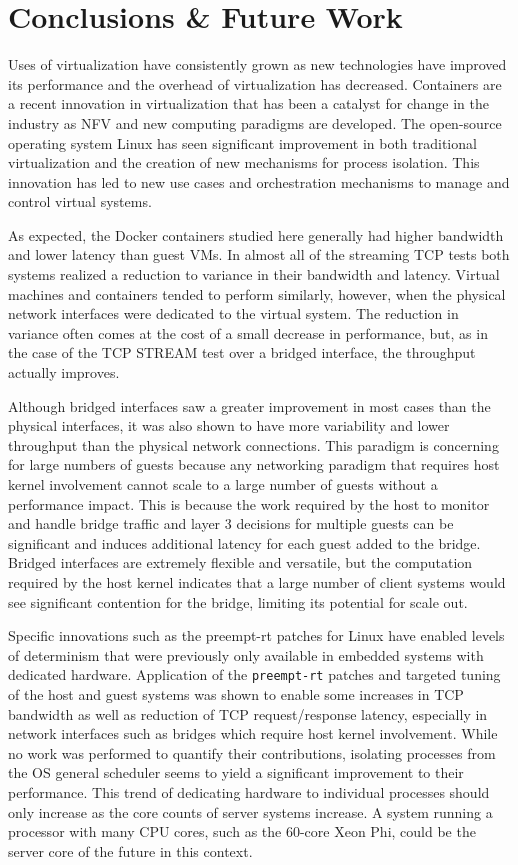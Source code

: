 \chapter{Conclusions \& Future Work}
\label{sec:conclusions}
Uses of virtualization have consistently grown as new technologies have improved its performance and the overhead of virtualization has decreased.  
Containers are a recent innovation in virtualization that has been a catalyst for change in the industry as NFV and new computing paradigms are developed.
The open-source operating system Linux has seen significant improvement in both traditional virtualization and the creation of new mechanisms for process isolation.  
This innovation has led to new use cases and orchestration mechanisms to manage and control virtual systems.

As expected, the Docker containers studied here generally had higher bandwidth and lower latency than guest VMs.
In almost all of the streaming TCP tests both systems realized a reduction to variance in their bandwidth and latency.
Virtual machines and containers tended to perform similarly, however, when the physical network interfaces were dedicated to the virtual system.
The reduction in variance often comes at the cost of a small decrease in performance, but, as in the case of the TCP STREAM test over a bridged interface, the throughput actually improves.

Although bridged interfaces saw a greater improvement in most cases than the physical interfaces, it was also shown to have more variability and lower throughput than the physical network connections.  
This paradigm is concerning for large numbers of guests because any networking paradigm that requires host kernel involvement cannot scale to a large number of guests without a performance impact.
This is because the work required by the host to monitor and handle bridge traffic and layer 3 decisions for multiple guests can be significant and induces additional latency for each guest added to the bridge.    
Bridged interfaces are extremely flexible and versatile, but the computation required by the host kernel indicates that a large number of client systems would see significant contention for the bridge, limiting its potential for scale out.

Specific innovations such as the preempt-rt patches for Linux have enabled levels of determinism that were previously only available in embedded systems with dedicated hardware.  
Application of the \texttt{preempt-rt} patches and targeted tuning of the host and guest systems was shown to enable some increases in TCP bandwidth as well as reduction of TCP request/response latency, especially in network interfaces such as bridges which require host kernel involvement.   
While no work was performed to quantify their contributions, isolating processes from the OS general scheduler seems to yield a significant improvement to their performance.
This trend of dedicating hardware to individual processes should only increase as the core counts of server systems increase.
A system running a processor with many CPU cores, such as the 60-core Xeon Phi, could be the server core of the future in this context.

